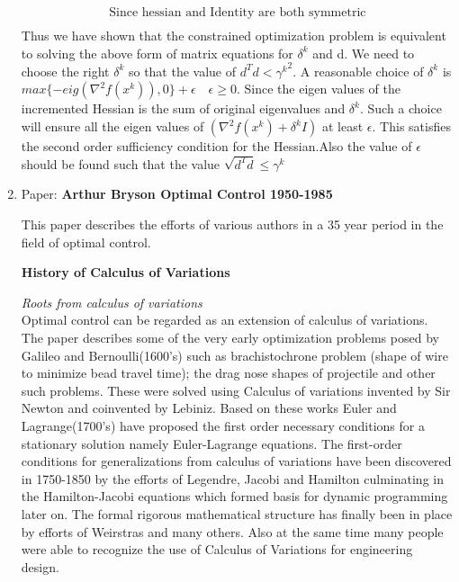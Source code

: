 \begin{enumerate}
\begin{align*}
\text{Since hessian and Identity are both symmetric}\\
 \end{align*}
 Thus we have shown that the constrained optimization problem is equivalent to
solving the above form of matrix equations for $\delta^k$ and d. We need to choose the right $\delta^k$ so that the value of $d^Td < {\gamma^{k}}^2$. A reasonable choice of $\delta^k$ is
$max\{-eig(\nabla^2 f(x^k)),0\}+ \epsilon \quad \epsilon \geq 0 $. Since the eigen values of the incremented
Hessian is the sum of original eigenvalues and $\delta^k$. Such a choice will
ensure all the eigen values of $\left( \nabla^2 f(x^k) + \delta^k I\right)$ at least $\epsilon$. This satisfies the second order sufficiency condition for the Hessian.Also the value of 
$\epsilon$ should be found such that the value $\sqrt{d^Td} \leq \gamma^k$
% 
\item Paper: \textbf{Arthur Bryson Optimal Control 1950-1985}

This paper describes the efforts of various authors in a 35 year period in the field of optimal control.

\textbf{History of Calculus of Variations}

\emph{Roots from calculus of variations}\\
Optimal control can be regarded as an extension of calculus of variations. The paper describes some of the very early optimization problems posed by Galileo and Bernoulli(1600's) such as brachistochrone problem (shape of wire to minimize bead travel time); the drag nose shapes of projectile and other such problems. These were solved using Calculus of variations invented by Sir Newton and coinvented by Lebiniz. 
Based on these works Euler and Lagrange(1700's) have proposed the first order necessary conditions for a stationary solution namely Euler-Lagrange equations. 
The first-order conditions for generalizations from calculus of variations have been discovered in 1750-1850 by the efforts of Legendre, Jacobi and Hamilton culminating in the Hamilton-Jacobi equations which formed basis for dynamic programming later on.
The formal rigorous mathematical structure has finally been in place by efforts of Weirstras and many others. Also at the same time many people were able to recognize the use of Calculus of Variations for engineering design.


\end{enumerate}
